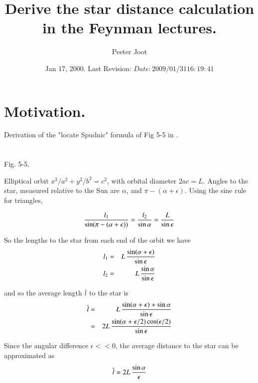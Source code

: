 \documentclass{article}
\title{ Derive the star distance calculation in the Feynman lectures. }
\author{Peeter Joot}
\date{ Jan 17, 2000.  Last Revision: $Date: 2009/01/31 16:19:41 $ }
\begin{document}
\maketitle{}

\section{ Motivation. }

Derivation of the "locate Spudnic" formula of Fig 5-5 in 
\cite{feynman1963flp}.

\section{}


%
%
%

Fig. 5-5.
\vspace{5cm}


%


Elliptical orbit $x^2/a^2 + y^2/b^2 = c^2$, with orbital diameter $2ac = L$.
Angles to the star, measured relative to the Sun are $\alpha$, and 
$\pi - (\alpha+\epsilon)$.  Using the sine rule for triangles, 

\begin{displaymath}
  { l_1 \over \sin(\pi - (\alpha + \epsilon))} 
= { l_2 \over \sin{\alpha}}
= {  L \over \sin{\epsilon}}
\end{displaymath}

So the lengths to the star from each end of the orbit we have 
\begin{eqnarray*}
l_1 & = & L\, { \sin(\alpha + \epsilon) \over \sin{\epsilon}} \\
l_2 & = & L\, { \sin{\alpha} \over \sin{\epsilon}}
\end{eqnarray*}

and so the average length $\overline{l}$ to the star is 
\begin{eqnarray*}
\overline{l} & = & L\, { \sin(\alpha + \epsilon) + \sin{\alpha} \over \sin{\epsilon}} \\
             & = & 2L\, { \sin(\alpha + \epsilon/2)\cos(\epsilon/2) \over \sin{\epsilon}}
\end{eqnarray*}

Since the angular difference $\epsilon << 0$, the average distance to the star can be approximated as
\begin{displaymath}
\overline{l} = 2L\, { \sin{\alpha} \over \epsilon }
\end{displaymath}




\end{document}
